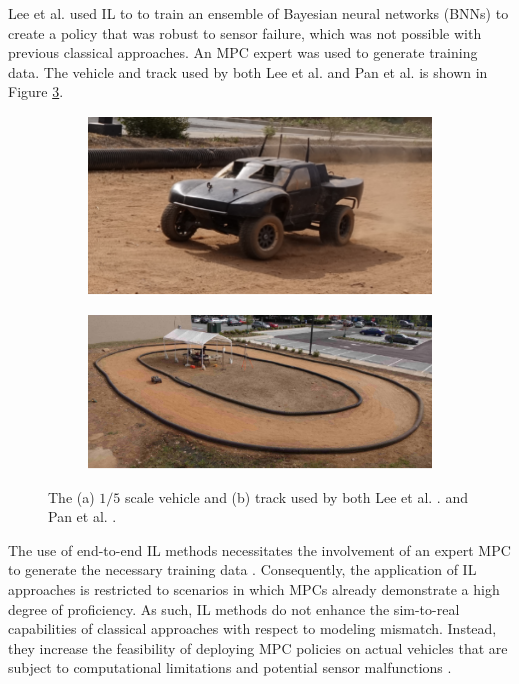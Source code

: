 Lee et al. \cite{lee2019} used IL to to train an ensemble of Bayesian neural networks (BNNs) to create a policy that was robust to sensor failure, which was not possible with previous classical approaches. 
An MPC expert was used to generate training data.
The vehicle and track used by both Lee et al. \cite{lee2019} and Pan et al. \cite{Pan2017a} is shown in Figure \ref{fig:lee_car_track}.

\begin{figure}[htb!]
    \centering
    \begin{subfigure}[htb!]{0.48\textwidth}
        \centering
        \includegraphics[height=.45\linewidth]{contents/chapt2/figs/IL_car.png}
        \caption[]{}
        \label{fig:IL_car}
    \end{subfigure}
    \hfill
    \begin{subfigure}[htb!]{0.48\textwidth}
        \centering
        \includegraphics[height=.45\linewidth]{contents/chapt2/figs/IL_track.png}
        \caption[]{}
        \label{fig:IL_track}
    \end{subfigure}
    \hfill
    \caption[The car and track used by Lee et al.]{The (a) $1/5$ scale vehicle and (b) track used by both Lee et al. \cite{lee2019}. and Pan et al. \cite{Pan2017a}.}
\label{fig:lee_car_track}
\end{figure}

The use of end-to-end IL methods necessitates the involvement of an expert MPC to generate the necessary training data \cite{Pan2017}. 
Consequently, the application of IL approaches is restricted to scenarios in which MPCs already demonstrate a high degree of proficiency. 
As such, IL methods do not enhance the sim-to-real capabilities of classical approaches with respect to modeling mismatch. 
Instead, they increase the feasibility of deploying MPC policies on actual vehicles that are subject to computational limitations and potential sensor malfunctions \cite{lee2019, Pan2017}.

